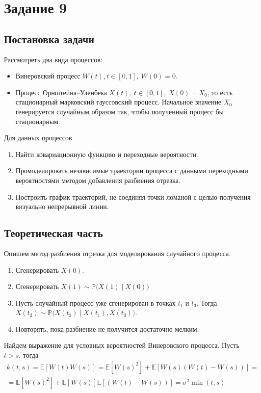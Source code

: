 \documentclass[12pt, a4paper]{article} %
\def\Pro{\mathbb{P}} %
\begin{document}
\section{Задание 9}
\subsection{Постановка задачи}
Рассмотреть два вида процессов:
\begin{itemize}
	\item Винеровский процесс $W(t), t \in [0, 1], \ W(0) = 0.$
	\item Процесс Орнштейна--Уленбека $X(t),\ t \in [0, 1], \ X(0) = X_0$, то есть стационарный марковский гауссовский процесс. Начальное значение $X_0$ генерируется случайным образом так, чтобы полученный процесс бы стационарным.
\end{itemize}

Для данных процессов
\begin{enumerate}
	\item Найти ковариационную функцию и переходные вероятности.
	\item Промоделировать независимые траектории процесса с данными переходными вероятностями методом добавления разбиения отрезка.
	\item Построить график траекторий, не соединяя точки ломаной с целью получения визуально непрерывной линии.
\end{enumerate}

\subsection{Теоретическая часть}
Опишем метод разбиения отрезка для моделирования случайного процесса.
\begin{enumerate}
    \item Сгенерировать $X(0)$.
    \item Сгенерировать  $X(1) \sim \Pro\bigl(X(1) \mid X(0)\bigr)$ 
    \item Пусть случайный процесс уже сгенерирован в точках  $t_1$ и $t_3$.
        Тогда $X(t_2) \sim \Pro\bigl( X(t_2) \mid X(t_1), X(t_3) \bigr)$.
    \item Повторять, пока разбиение не получится достаточно мелким.
\end{enumerate} 

Найдем выражение для условных вероятностей Винеровского процесса.
Пусть $t > s$, тогда
\begin{multline*}
    k(t, s) = \mathbb{E}[W(t)W(s)] = \mathbb{E}\left[W(s)^2\right] + \mathbb{E}\left[W(s)(W(t) - W(s))\right] =  \\ =
    \mathbb{E}\left[W(s)^2\right] + \mathbb{E}\left[W(s)\right]\mathbb{E}\left[(W(t) - W(s))\right] = 
    \sigma^2 \min(t, s)
\end{multline*}
\end{document}
